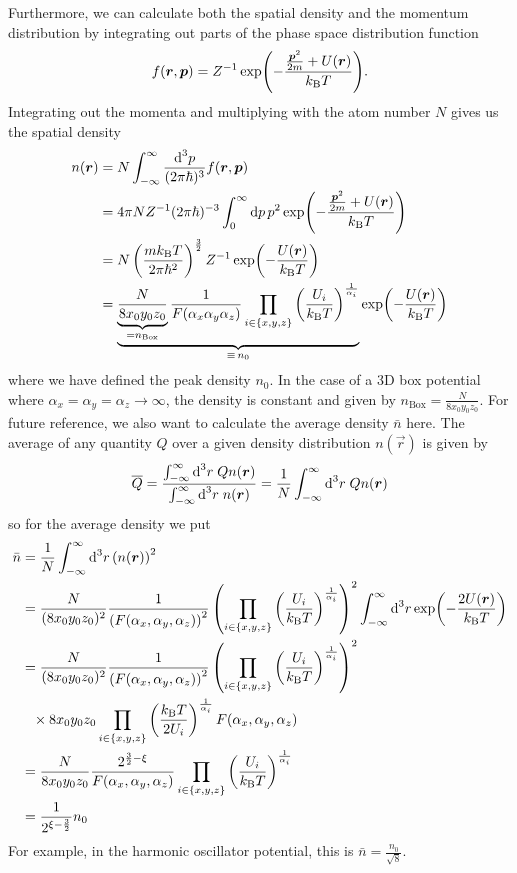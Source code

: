 Furthermore, we can calculate both the spatial density and the momentum distribution by integrating out parts of the phase space distribution function
\begin{equation*}
    f(\boldsymbol{r},\boldsymbol{p}) = Z^{-1}\exp\!{\left(-\frac{\frac{\boldsymbol{p}^2}{2m} + U(\boldsymbol{r})}{k_\text{B} T}\right)}.
\end{equation*}
Integrating out the momenta and multiplying with the atom number $N$ gives us the spatial density
\begin{align}
    n(\boldsymbol{r}) &= N\int_{-\infty}^\infty \frac{\text{d}^{3}p}{(2\pi\hbar)^3} f(\boldsymbol{r},\boldsymbol{p}) \nonumber \\
    &= 4\pi N Z^{-1} (2\pi\hbar)^{-3} \int_0^\infty \text{d}p\, p^2 \exp\!\left(-\frac{\frac{\boldsymbol{p}^2}{2m} + U(\boldsymbol{r})}{k_\text{B} T}\right) \nonumber \\
    &= N \left(\frac{mk_\text{B} T}{2\pi\hbar^2}\right)^{\frac{3}{2}} Z^{-1} \exp\!\left(-\frac{U(\boldsymbol{r})}{k_\text{B} T}\right) \nonumber \\
    &= \underbrace{\underbrace{\frac{N}{8x_0y_0z_0}}_{=n_\text{Box}}\frac{1}{F(\alpha_x\alpha_y\alpha_z)}\prod_{i\in\{x,y,z\}}\left(\frac{U_i}{k_\text{B} T}\right)^{\frac{1}{\alpha_i}}}_{\equiv\, n_0} \exp\!\left(-\frac{U(\boldsymbol{r})}{k_\text{B} T}\right) \label{eq:spatial_density}
\end{align}
where we have defined the peak density $n_0$. In the case of a 3D box potential where $\alpha_x = \alpha_y = \alpha_z \rightarrow \infty$, the density is constant and given by $n_\text{Box} = \frac{N}{8x_0y_0z_0}$.
For future reference, we also want to calculate the average density $\bar{n}$ here. The average of any quantity $Q$ over a given density distribution $n(\vec{r})$ is given by
\[\overline{Q} = \frac{\int_{-\infty}^\infty \text{d}^{3}r\; Q n(\boldsymbol{r})}{\int_{-\infty}^\infty \text{d}^{3}r\; n(\boldsymbol{r})} = \frac{1}{N} \int_{-\infty}^\infty \text{d}^{3}r\; Q n(\boldsymbol{r})\]
so for the average density we put
\begin{align}
    \bar{n} &= \frac{1}{N} \int_{-\infty}^{\infty} \text{d}^{3}r \left(n(\boldsymbol{r})\right)^2 \nonumber \\
    &= \frac{N}{(8x_0y_0z_0)^2} \frac{1}{\left(F(\alpha_x,\alpha_y,\alpha_z)\right)^2} \left(\prod_{i\in\{x,y,z\}} \left(\frac{U_i}{k_\text{B} T}\right)^{\frac{1}{\alpha_i}} \right)^2 \int_{-\infty}^{\infty} \text{d}^{3}r \exp\!\left(-\frac{2U(\boldsymbol{r})}{k_\text{B} T}\right) \nonumber \\
    &= \frac{N}{(8x_0y_0z_0)^2} \frac{1}{\left(F(\alpha_x,\alpha_y,\alpha_z)\right)^2} \left(\prod_{i\in\{x,y,z\}} \left(\frac{U_i}{k_\text{B} T}\right)^{\frac{1}{\alpha_i}} \right)^2 \nonumber \\
    &\phantom{=} \times 8x_0y_0z_0 \prod_{i\in\{x,y,z\}} \left(\frac{k_\text{B} T}{2 U_i}\right)^{\frac{1}{\alpha_i}} F(\alpha_x,\alpha_y,\alpha_z) \\
    &= \frac{N}{8x_0y_0z_0} \frac{2^{\frac{3}{2} - \xi}}{F(\alpha_x,\alpha_y,\alpha_z)} \prod_{i\in\{x,y,z\}} \left(\frac{U_i}{k_\text{B} T}\right)^{\frac{1}{\alpha_i}} \nonumber \\
    &= \frac{1}{2^{\xi - \frac{3}{2}}} n_0 \label{eq:mean_density}
\end{align}
For example, in the harmonic oscillator potential, this is $\bar{n} = \frac{n_0}{\sqrt{8}}$.

